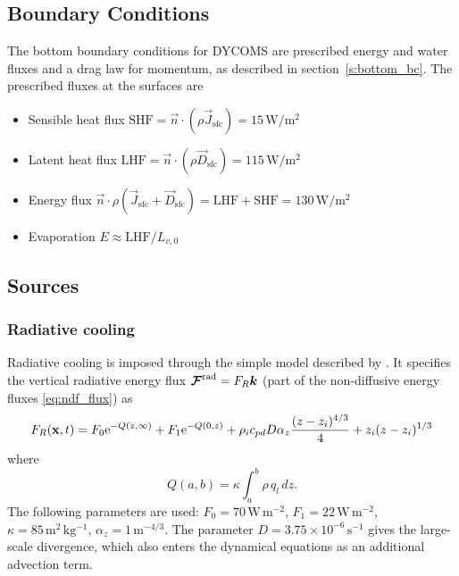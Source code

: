 \documentclass{report}
\begin{document}
{\subsection{Boundary Conditions}

The bottom boundary conditions for DYCOMS are prescribed energy and water fluxes and a drag law for momentum, as described in section~\ref{s:bottom_bc}. The prescribed fluxes at the surfaces are
\begin{itemize} 
\item Sensible heat flux $\mathrm{SHF} = \vec{n} \cdot (\rho \vec{J}_{\mathrm{sfc}}) = 15\,\mathrm{W/m^2}$
\item Latent heat flux $\mathrm{LHF} = \vec{n} \cdot (\rho \vec{D}_{\mathrm{sfc}}) = 115\,\mathrm{W/m^2}$
\item Energy flux $\vec{n} \cdot \rho (\vec{J}_{\mathrm{sfc}} + \vec{D}_{\mathrm{sfc}}) = \mathrm{LHF + SHF} = 130\,\mathrm{W/m^2}$
\item Evaporation $E \approx \mathrm{LHF}/L_{v,0}$
\end{itemize}

\subsection{Sources}

\subsubsection{Radiative cooling}
Radiative cooling is imposed through the simple model described by \cite{Stevens05a}. It specifies the vertical radiative energy flux $\boldsymbol{{\mathcal{F}}}^{\mathrm{rad}} = F_R \boldsymbol{{k}}$ (part of the non-diffusive energy fluxes \eqref{eq:ndf_flux}) as
\begin{equation}
    \label{e:radiativeStevens05}
    F_{R}({\bf x}, t) = F_0{\rm e}^{-Q(z,\infty)} +
    F_1{\rm e}^{-Q(0, z)} +
    \rho_i c_{pd} D \alpha_z\frac{(z-z_i)^{4/3}}{4} + z_i(z - z_i)^{1/3}
\end{equation}
where 
\begin{equation}
    Q(a,b) = \kappa\int_{a}^{b}\rho\,q_l\,dz.
\end{equation}
The following parameters are used:
$F_0=70\,\mathrm{W\,m^{-2}}$, $F_1=22\,\mathrm{W\,m^{-2}}$, $\kappa=85\,\mathrm{m^2\,kg^{-1}}$, $\alpha_z=1\,\mathrm{m^{-4/3}}$. The parameter $D=3.75\times 10^{-6}\,\mathrm{s^{-1}}$ gives the large-scale divergence, which also enters the dynamical equations as an additional advection term.  

}
\end{document}
